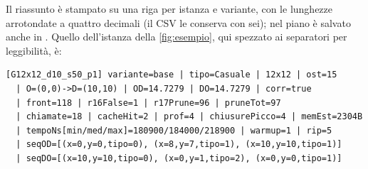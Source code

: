 Il riassunto è stampato su una riga per istanza e variante, con le lunghezze
arrotondate a quattro decimali (il CSV le conserva con sei); nel piano è
salvato anche in . Quello dell'istanza della
\cref{fig:esempio}, qui spezzato ai separatori per leggibilità, è:

\begin{lstlisting}
[G12x12_d10_s50_p1] variante=base | tipo=Casuale | 12x12 | ost=15
  | O=(0,0)->D=(10,10) | OD=14.7279 | DO=14.7279 | corr=true
  | front=118 | r16False=1 | r17Prune=96 | pruneTot=97
  | chiamate=18 | cacheHit=2 | prof=4 | chiusurePicco=4 | memEst=2304B
  | tempoNs[min/med/max]=180900/184000/218900 | warmup=1 | rip=5
  | seqOD=[(x=0,y=0,tipo=0), (x=8,y=7,tipo=1), (x=10,y=10,tipo=1)]
  | seqDO=[(x=10,y=10,tipo=0), (x=0,y=1,tipo=2), (x=0,y=0,tipo=1)]
\end{lstlisting}
